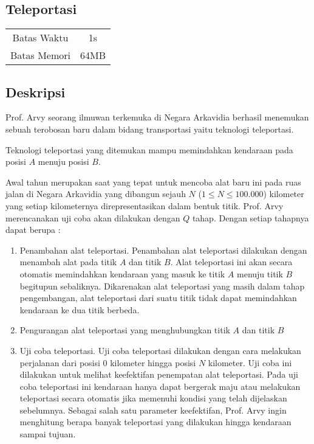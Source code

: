 \documentclass{article}
\begin{document}
\begin{center}
    \section*{Teleportasi} %

    \begin{tabular}{ | c c | }
        \hline
        Batas Waktu  & 1s \\    %
        Batas Memori & 64MB \\  %
        \hline
    \end{tabular}
\end{center}

\subsection*{Deskripsi}

Prof. Arvy seorang ilmuwan terkemuka di Negara Arkavidia berhasil menemukan sebuah terobosan baru dalam bidang transportasi yaitu teknologi teleportasi.

Teknologi teleportasi yang ditemukan mampu memindahkan kendaraan pada posisi $A$ menuju posisi $B$.

Awal tahun merupakan saat yang tepat untuk mencoba alat baru ini pada ruas jalan di Negara Arkavidia yang dibangun sejauh $N$ ($1 \leq N \leq 100.000$) kilometer yang setiap kilometernya direpresentasikan dalam bentuk titik. Prof. Arvy merencanakan uji coba akan dilakukan dengan $Q$ tahap. Dengan setiap tahapnya dapat berupa :

\begin{enumerate}
    \setlength\itemsep{0pt}
    \item  Penambahan alat teleportasi. Penambahan alat teleportasi dilakukan dengan menambah alat pada titik $A$ dan titik $B$. Alat teleportasi ini akan secara otomatis memindahkan kendaraan yang masuk ke titik $A$ menuju titik $B$ begitupun sebaliknya. Dikarenakan alat teleportasi yang masih dalam tahap pengembangan, alat teleportasi dari suatu titik tidak dapat memindahkan kendaraan ke dua titik berbeda.

    \item Pengurangan alat teleportasi yang menghubungkan titik $A$ dan titik $B$

    \item Uji coba teleportasi. Uji coba teleportasi dilakukan dengan cara melakukan perjalanan dari posisi $0$ kilometer hingga posisi $N$ kilometer. Uji coba ini dilakukan untuk melihat keefektifan penempatan alat teleportasi. Pada uji coba teleportasi ini kendaraan hanya dapat bergerak maju atau melakukan teleportasi secara otomatis jika memenuhi kondisi yang telah dijelaskan sebelumnya. Sebagai salah satu parameter keefektifan, Prof. Arvy ingin menghitung berapa banyak teleportasi yang dilakukan hingga kendaraan sampai tujuan.   
\end{enumerate}
\end{document}

